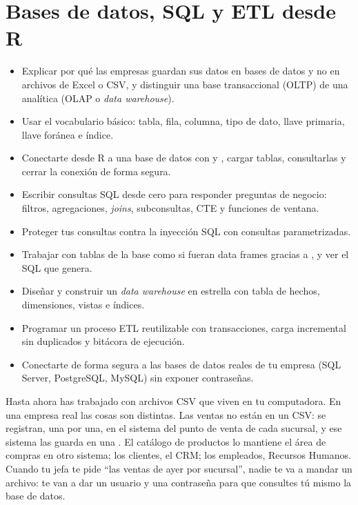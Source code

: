 \chapter{Bases de datos, SQL y ETL desde R}
\label{cap:bases-datos}

\begin{objetivos}
\begin{itemize}
  \item Explicar por qué las empresas guardan sus datos en bases de datos y
        no en archivos de Excel o CSV, y distinguir una base transaccional
        (OLTP) de una analítica (OLAP o \emph{data warehouse}).
  \item Usar el vocabulario básico: tabla, fila, columna, tipo de dato,
        llave primaria, llave foránea e índice.
  \item Conectarte desde R a una base de datos con  y
        , cargar tablas, consultarlas y cerrar la conexión
        de forma segura.
  \item Escribir consultas SQL desde cero para responder preguntas de
        negocio: filtros, agregaciones, \emph{joins}, subconsultas, CTE y
        funciones de ventana.
  \item Proteger tus consultas contra la inyección SQL con consultas
        parametrizadas.
  \item Trabajar con tablas de la base como si fueran data frames gracias a
        , y ver el SQL que genera.
  \item Diseñar y construir un \emph{data warehouse} en estrella con tabla
        de hechos, dimensiones, vistas e índices.
  \item Programar un proceso ETL reutilizable con transacciones, carga
        incremental sin duplicados y bitácora de ejecución.
  \item Conectarte de forma segura a las bases de datos reales de tu
        empresa (SQL Server, PostgreSQL, MySQL) sin exponer contraseñas.
\end{itemize}
\end{objetivos}

Hasta ahora has trabajado con archivos CSV que viven en tu computadora. En
una empresa real las cosas son distintas. Las ventas no están en un CSV: se
registran, una por una, en el sistema del punto de venta de cada sucursal, y
ese sistema las guarda en una . El catálogo de
productos lo mantiene el área de compras en otro sistema; los clientes, el
CRM; los empleados, Recursos Humanos. Cuando tu jefa te pide ``las ventas de
ayer por sucursal'', nadie te va a mandar un archivo: te van a dar un usuario
y una contraseña para que consultes tú mismo la base de datos.

